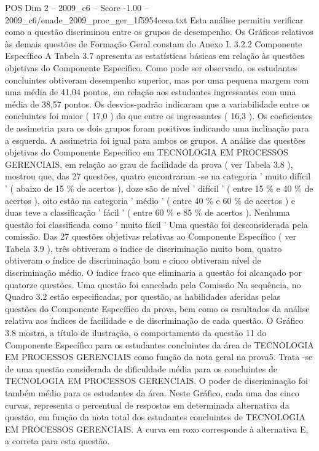 \begin{textsample}{POS Dim 2 – 2009\_c6 – Score -1.00 – 2009\_c6/enade\_2009\_proc\_ger\_1f5954ceea.txt}
Esta análise permitiu verificar como a questão discriminou entre os grupos de desempenho.
Os Gráficos relativos às demais questões de Formação Geral constam do Anexo I. 3.2.2 Componente Específico A Tabela 3.7 apresenta as estatísticas básicas em relação às questões objetivas do Componente Específico.
Como pode ser observado, os estudantes concluintes obtiveram desempenho superior, mas por uma pequena margem com uma média de 41,04 pontos, em relação aos estudantes ingressantes com uma média de 38,57 pontos.
Os desvios-padrão indicaram que a variabilidade entre os concluintes foi maior ( 17,0 ) do que entre os ingressantes ( 16,3 ).
Os coeficientes de assimetria para os dois grupos foram positivos indicando uma inclinação para a esquerda.
A assimetria foi igual para ambos os grupos.
A análise das questões objetivas do Componente Específico em TECNOLOGIA EM PROCESSOS GERENCIAIS, em relação ao grau de facilidade da prova ( ver Tabela 3.8 ), mostrou que, das 27 questões, quatro encontraram -se na categoria ' muito difícil ' ( abaixo de 15 \% de acertos ), doze são de nível ' difícil ' ( entre 15 \% e 40 \% de acertos ), oito estão na categoria ' médio ' ( entre 40 \% e 60 \% de acertos ) e duas teve a classificação ' fácil ' ( entre 60 \% e 85 \% de acertos ).
Nenhuma questão foi classificada como ' muito fácil ' Uma questão foi desconsiderada pela comissão.
Das 27 questões objetivas relativas ao Componente Específico ( ver Tabela 3.9 ), três obtiveram o índice de discriminação muito bom, quatro obtiveram o índice de discriminação bom e cinco obtiveram nível de discriminação médio.
O índice fraco que eliminaria a questão foi alcançado por quatorze questões.
Uma questão foi cancelada pela Comissão Na sequência, no Quadro 3.2 estão especificadas, por questão, as habilidades aferidas pelas questões do Componente Específico da prova, bem como os resultados da análise relativa aos índices de facilidade e de discriminação de cada questão.
O Gráfico 3.8 mostra, a título de ilustração, o comportamento da questão 11 do Componente Específico para os estudantes concluintes da área de TECNOLOGIA EM PROCESSOS GERENCIAIS como função da nota geral na prova5.
Trata -se de uma questão considerada de dificuldade média para os concluintes de TECNOLOGIA EM PROCESSOS GERENCIAIS.
O poder de discriminação foi também médio para os estudantes da área.
Neste Gráfico, cada uma das cinco curvas, representa o percentual de respostas em determinada alternativa da questão, em função da nota total dos estudantes concluintes de TECNOLOGIA EM PROCESSOS GERENCIAIS.
A curva em roxo corresponde à alternativa E, a correta para esta questão.

\end{textsample}
